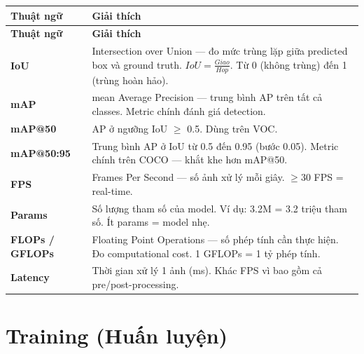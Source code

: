 \documentclass[12pt,a4paper]{report}
\begin{document}
\begin{longtable}{p{3.5cm}p{12cm}}
\toprule
\textbf{Thuật ngữ} & \textbf{Giải thích} \\
\midrule
\endfirsthead
\toprule
\textbf{Thuật ngữ} & \textbf{Giải thích} \\
\midrule
\endhead

\textbf{IoU} & Intersection over Union --- đo mức trùng lặp giữa predicted box và ground truth. $IoU = \frac{Giao}{Hop}$. Từ 0 (không trùng) đến 1 (trùng hoàn hảo). \\
\midrule
\textbf{mAP} & mean Average Precision --- trung bình AP trên tất cả classes. Metric chính đánh giá detection. \\
\midrule
\textbf{mAP@50} & AP ở ngưỡng IoU $\geq$ 0.5. Dùng trên VOC. \\
\midrule
\textbf{mAP@50:95} & Trung bình AP ở IoU từ 0.5 đến 0.95 (bước 0.05). Metric chính trên COCO --- khắt khe hơn mAP@50. \\
\midrule
\textbf{FPS} & Frames Per Second --- số ảnh xử lý mỗi giây. $\geq$30 FPS = real-time. \\
\midrule
\textbf{Params} & Số lượng tham số của model. Ví dụ: 3.2M = 3.2 triệu tham số. Ít params = model nhẹ. \\
\midrule
\textbf{FLOPs / GFLOPs} & Floating Point Operations --- số phép tính cần thực hiện. Đo computational cost. 1 GFLOPs = 1 tỷ phép tính. \\
\midrule
\textbf{Latency} & Thời gian xử lý 1 ảnh (ms). Khác FPS vì bao gồm cả pre/post-processing. \\
\bottomrule
\end{longtable}

\section*{Training (Huấn luyện)}
\end{document}
